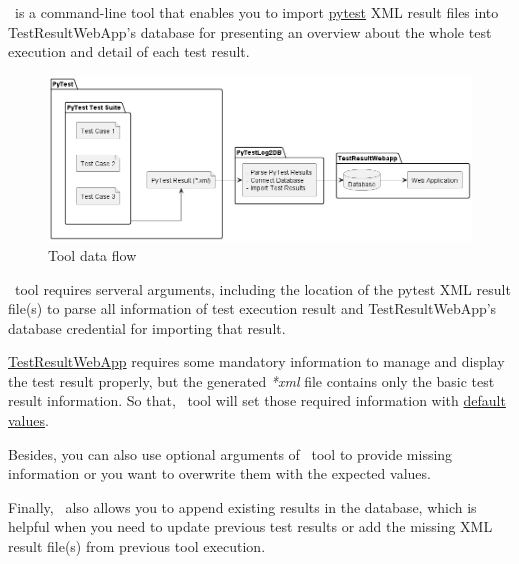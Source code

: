 



\pkg\ is a command-line tool that enables you to import 
\href{https://docs.pytest.org/}{pytest} XML result 
files into TestResultWebApp's database for presenting an overview about the 
whole test execution and detail of each test result.

\begin{figure}[h!]
   \includegraphics[width=1\linewidth]{./pictures/data_flow.png}
   \caption{Tool data flow}
\end{figure}

\pkg\ tool requires serveral arguments, including the location of the pytest 
XML result file(s) to parse all information of test execution result and 
TestResultWebApp's database credential for importing that result.

\href{https://github.com/test-fullautomation/testresultwebapp}{TestResultWebApp} 
requires some mandatory information to manage and display the test result 
properly, but the generated \emph{*xml} file contains only the basic test result
information. So that, \pkg\ tool will set those required information with 
\hyperref[default-values]{default values}.

Besides, you can also use optional arguments of \pkg\ tool to provide missing 
information or you want to overwrite them with the expected values.

Finally, \pkg\ also allows you to append existing results in the database, which 
is helpful when you need to update previous test results or add the missing 
XML result file(s) from previous tool execution.